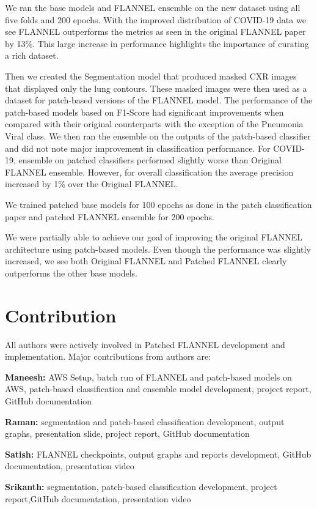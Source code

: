 \documentclass{sigkddExp}
\begin{document}
We ran the base models and FLANNEL ensemble on the new dataset using all five
folds and 200 epochs. With the improved distribution of COVID-19 data we see
FLANNEL outperforms the metrics as seen in the original FLANNEL paper by 13\%.
This large increase in performance highlights the importance of curating a rich
dataset.

Then we created the Segmentation model that produced masked CXR images that
displayed only the lung contours. These masked images were then used as a
dataset for patch-based versions of the FLANNEL model. The performance of the
patch-based models based on F1-Score had significant improvements when compared
with their original counterparts with the exception of the Pneumonia Viral
class. We then ran the ensemble on the outputs of the patch-based classifier
and did not note major improvement in classification performance. For COVID-19,
ensemble on patched classifiers performed slightly worse than Original FLANNEL
ensemble. However, for overall classification the average precision increased
by 1\% over the Original FLANNEL.

We trained patched base models for 100 epochs as done in the patch
classification paper and patched FLANNEL ensemble for 200 epochs.

We were partially able to achieve our goal of improving the original FLANNEL
architecture using patch-based models. Even though the performance was slightly
increased, we see both Original FLANNEL and Patched FLANNEL clearly outperforms
the other base models.

\section{Contribution}

All authors were actively involved in Patched FLANNEL development and
implementation. Major contributions from authors are:

\textbf{Maneesh:} AWS Setup, batch run of FLANNEL and patch-based models on
AWS, patch-based classification and ensemble model development, project
report, GitHub documentation

\textbf{Raman:} segmentation and patch-based classification development,
output graphs, presentation slide, project report, GitHub
documentation

\textbf{Satish:} FLANNEL checkpoints, output graphs and reports development,
GitHub documentation, presentation video

\textbf{Srikanth:} segmentation, patch-based classification development, project
report,GitHub documentation, presentation video
\end{document}
